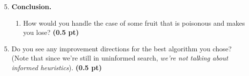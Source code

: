 \documentclass[11pt,a4paper]{../template/report}
\begin{document}
\begin{enumerate}
\setcounter{enumi}{4}
\item \textbf{Conclusion.}
\begin{enumerate}
        \item How would you handle the case of some fruit that is poisonous and makes
you lose?
\textbf{(0.5 pt)}
\end{enumerate}

\end{enumerate}

\begin{answer}
\end{answer}

\begin{enumerate}
\setcounter{enumi}{4}
\begin{enumerate}
\setcounter{enumii}{4}
        \item  Do you see any improvement directions for the best algorithm you chose? (Note that since we're still in uninformed search, \textit{we're not talking about informed heuristics}). \textbf{(0.5 pt)}
\end{enumerate}

\end{enumerate}

\begin{answer}
\end{answer}
\end{document}
